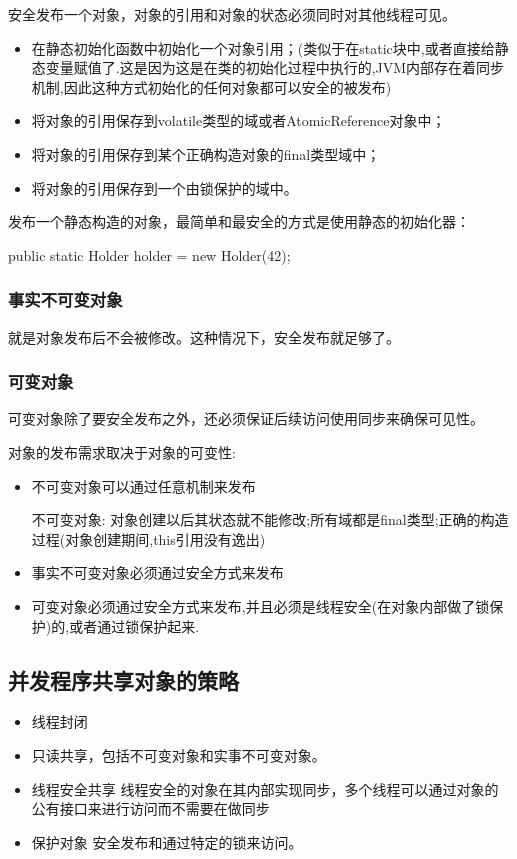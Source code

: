 安全发布一个对象，对象的引用和对象的状态必须同时对其他线程可见。
\begin{itemize}
\item 在静态初始化函数中初始化一个对象引用；(类似于在static块中,或者直接给静态变量赋值了.这是因为这是在类的初始化过程中执行的,JVM内部存在着同步机制,因此这种方式初始化的任何对象都可以安全的被发布)
\item 将对象的引用保存到volatile类型的域或者AtomicReference对象中；
\item 将对象的引用保存到某个正确构造对象的final类型域中；
\item 将对象的引用保存到一个由锁保护的域中。
\end{itemize}

发布一个静态构造的对象，最简单和最安全的方式是使用静态的初始化器：
\begin{Java}
public static Holder holder = new Holder(42);
\end{Java}

\subsubsection{事实不可变对象}
就是对象发布后不会被修改。这种情况下，安全发布就足够了。

\subsubsection{可变对象}

可变对象除了要安全发布之外，还必须保证后续访问使用同步来确保可见性。

对象的发布需求取决于对象的可变性:
\begin{itemize}
\item 不可变对象可以通过任意机制来发布

不可变对象: 对象创建以后其状态就不能修改;所有域都是final类型;正确的构造过程(对象创建期间,this引用没有逸出)

\item 事实不可变对象必须通过安全方式来发布

\item 可变对象必须通过安全方式来发布,并且必须是线程安全(在对象内部做了锁保护)的,或者通过锁保护起来.
\end{itemize}

\subsection{并发程序共享对象的策略}
\begin{itemize}
\item 线程封闭
\item 只读共享，包括不可变对象和实事不可变对象。
\item 线程安全共享 线程安全的对象在其内部实现同步，多个线程可以通过对象的公有接口来进行访问而不需要在做同步
\item 保护对象 安全发布和通过特定的锁来访问。
\end{itemize}


